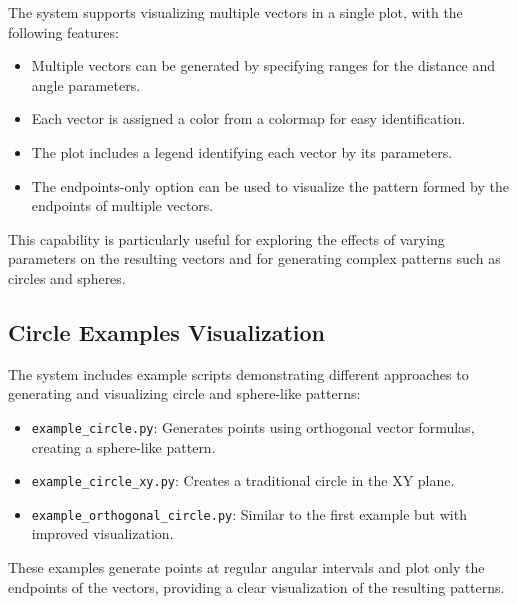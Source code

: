 The system supports visualizing multiple vectors in a single plot, with the following features:

\begin{itemize}
    \item Multiple vectors can be generated by specifying ranges for the distance and angle parameters.
    \item Each vector is assigned a color from a colormap for easy identification.
    \item The plot includes a legend identifying each vector by its parameters.
    \item The endpoints-only option can be used to visualize the pattern formed by the endpoints of multiple vectors.
\end{itemize}

This capability is particularly useful for exploring the effects of varying parameters on the resulting vectors and for generating complex patterns such as circles and spheres.

\subsection{Circle Examples Visualization}

The system includes example scripts demonstrating different approaches to generating and visualizing circle and sphere-like patterns:

\begin{itemize}
    \item \texttt{example\_circle.py}: Generates points using orthogonal vector formulas, creating a sphere-like pattern.
    \item \texttt{example\_circle\_xy.py}: Creates a traditional circle in the XY plane.
    \item \texttt{example\_orthogonal\_circle.py}: Similar to the first example but with improved visualization.
\end{itemize}

These examples generate points at regular angular intervals and plot only the endpoints of the vectors, providing a clear visualization of the resulting patterns.

